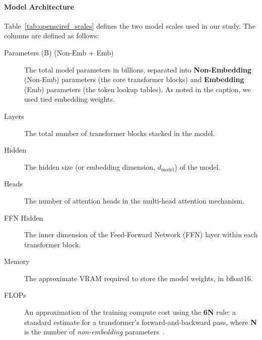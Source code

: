 \paragraph{Model Architecture}
Table~\ref{tab:opensciref_scales} defines the two model scales used in our study. The columns are defined as follows:

\begin{description}
    \item[Parameters (B) (Non-Emb + Emb)] The total model parameters in billions, separated into \textbf{Non-Embedding} (Non-Emb) parameters (the core transformer blocks) and \textbf{Embedding} (Emb) parameters (the token lookup tables). As noted in the caption, we used tied embedding weights.
    \item[Layers] The total number of transformer blocks stacked in the model.
    \item[Hidden] The hidden size (or embedding dimension, $d_{\text{model}}$) of the model.
    \item[Heads] The number of attention heads in the multi-head attention mechanism.
    \item[FFN Hidden] The inner dimension of the Feed-Forward Network (FFN) layer within each transformer block.
    \item[Memory] The approximate VRAM required to store the model weights, in bfloat16.
    \item[FLOPs] An approximation of the training compute cost using the  \textbf{6N} rule: a standard estimate for a transformer's forward-and-backward pass, where \textbf{N} is the number of \textit{non-embedding} parameters~\citep{kaplan2020scalinglawsneurallanguage}.
\end{description}

